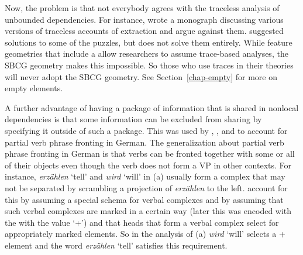 \addlines
Now, the problem is that not everybody agrees with the traceless analysis of unbounded
dependencies. For instance, \citet{LH2006a} wrote a monograph discussing various versions of
traceless accounts of extraction and argue against them. \citet{Chaves2009a} suggested solutions to
some of the puzzles, but does not solve them entirely. While feature geometries that include a
\localf allow researchers to assume trace-based analyses, the SBCG geometry makes this
impossible. So those who use traces in their theories will never adopt the SBCG geometry. See Section~\ref{chap-empty} for
more on empty elements.

A further advantage of having a package of information that is shared in nonlocal dependencies is
that some information can be excluded from sharing by specifying it outside of such a package. This
was used by \citet{Hoehle94a}, \citet{Mueller96a,Mueller2002b}, and \citet{Meurers99a} to account for partial
verb phrase fronting in German. The generalization about partial verb phrase fronting in German is
that verbs can be fronted together with some or all of their objects even though the verb does not
form a VP in other contexts. For instance, \emph{erzählen} `tell' and \emph{wird} `will' in
(a) usually form a complex that may not be separated by scrambling a projection of
\emph{erzählen} to the left.
\eal
{}
\zl
\citet{HN94a} account for this by assuming a special schema for verbal complexes and by assuming
that such verbal complexes are marked in a certain way (later this was encoded with the \lexf with
the value `+') and that heads that form a verbal complex select for appropriately marked
elements. So in the analysis of (a) \emph{wird} `will' selects a \lex+ element and the word
\emph{erzählen} `tell' satisfies this requirement.

